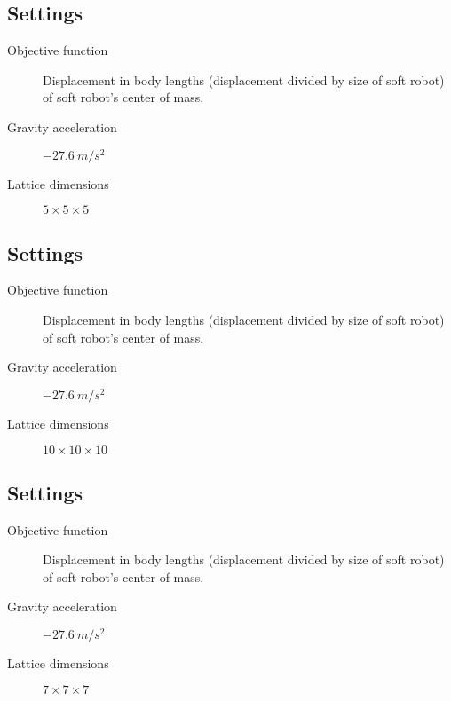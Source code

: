 \subsection{Settings}
\label{Settings1}
\begin{small}
\begin{description}
\item[Objective function]{Displacement in body lengths (displacement divided by size of soft robot) of soft robot's center of mass.}
\item[Gravity acceleration]{$-27.6\ m/s^2$}
\item[Lattice dimensions]{$5 \times 5 \times 5$}
\end{description}
\end{small}

\subsection{Settings}
\label{Settings2}
\begin{small}
\begin{description}
\item[Objective function]{Displacement in body lengths (displacement divided by size of soft robot) of soft robot's center of mass.}
\item[Gravity acceleration]{$-27.6\ m/s^2$}
\item[Lattice dimensions]{$10 \times 10 \times 10$}
\end{description}
\end{small}

\subsection{Settings}
\label{Settings3}
\begin{small}
\begin{description}
\item[Objective function]{Displacement in body lengths (displacement divided by size of soft robot) of soft robot's center of mass.}
\item[Gravity acceleration]{$-27.6\ m/s^2$}
\item[Lattice dimensions]{$7 \times 7 \times 7$}
\end{description}
\end{small}


